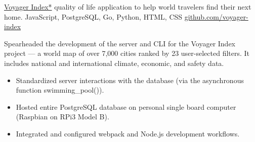 \showoff
{\textcolor{my-blue}{\href{https://voyager-index.herokuapp.com}{Voyager Index*}}}
{quality of life application to help world travelers find their next home.}
{JavaScript, PostgreSQL, Go, Python, HTML, CSS}
{\textcolor{my-blue}{\href{https://github.com/voyager-index/}{github.com/voyager-index}}}

Spearheaded the development of the server and CLI for the Voyager Index project — a world map of over 7,000 cities ranked by 23 user-selected filters. It includes national and international climate, economic, and safety data.

\begin{itemize}[label=$\triangleright$, itemsep=0px, topsep=5px]
\item Standardized server interactions with the database (via the asynchronous function swimming\_pool()).
\item Hosted entire PostgreSQL database on personal single board computer (Raspbian on RPi3 Model B).
\item Integrated and configured webpack and Node.js development workflows.
\end{itemize}

\myBreak
